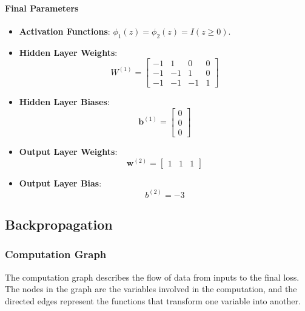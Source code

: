 \documentclass{article}
\begin{document}
\paragraph{Final Parameters}
\begin{itemize}
    \item \textbf{Activation Functions}: $\phi_1(z) = \phi_2(z) = I(z \ge 0)$.
    \item \textbf{Hidden Layer Weights}:
    \[ W^{(1)} = \begin{bmatrix} -1 & 1 & 0 & 0 \\ -1 & -1 & 1 & 0 \\ -1 & -1 & -1 & 1 \end{bmatrix} \]
    \item \textbf{Hidden Layer Biases}:
    \[ \mathbf{b}^{(1)} = \begin{bmatrix} 0 \\ 0 \\ 0 \end{bmatrix} \]
    \item \textbf{Output Layer Weights}:
    \[ \mathbf{w}^{(2)} = \begin{bmatrix} 1 & 1 & 1 \end{bmatrix} \]
    \item \textbf{Output Layer Bias}:
    \[ b^{(2)} = -3 \]
\end{itemize}




\subsection{Backpropagation}

\subsubsection*{Computation Graph}

The computation graph describes the flow of data from inputs to the final loss. The nodes in the graph are the variables involved in the computation, and the directed edges represent the functions that transform one variable into another.
\end{document}
